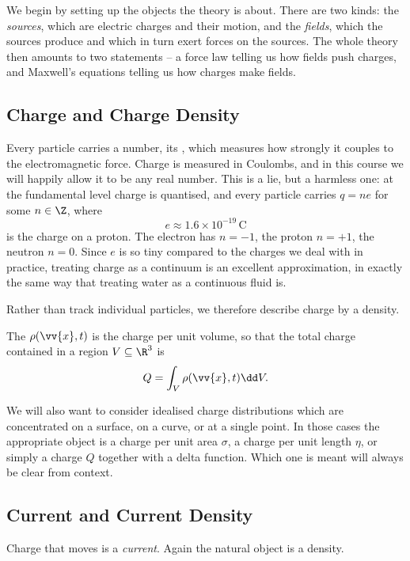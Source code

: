 We begin by setting up the objects the theory is about. There are two kinds: the \emph{sources}, which are electric charges and their motion, and the \emph{fields}, which the sources produce and which in turn exert forces on the sources. The whole theory then amounts to two statements -- a force law telling us how fields push charges, and Maxwell's equations telling us how charges make fields.

\subsection{Charge and Charge Density}

Every particle carries a number, its , which measures how strongly it couples to the electromagnetic force. Charge is measured in Coulombs, and in this course we will happily allow it to be any real number. This is a lie, but a harmless one: at the fundamental level charge is quantised, and every particle carries $q = ne$ for some $n \in \Z$, where
$$
e \approx 1.6 \times 10^{-19}\,\mathrm{C}
$$
is the charge on a proton. The electron has $n = -1$, the proton $n = +1$, the neutron $n = 0$. Since $e$ is so tiny compared to the charges we deal with in practice, treating charge as a continuum is an excellent approximation, in exactly the same way that treating water as a continuous fluid is.

Rather than track individual particles, we therefore describe charge by a density.

\begin{definition}
	The  $\rho(\vv{x}, t)$ is the charge per unit volume, so that the total charge contained in a region $V \subseteq \R^3$ is
	$$
	Q = \int_V \rho(\vv{x}, t) \dd V.
	$$
\end{definition}

We will also want to consider idealised charge distributions which are concentrated on a surface, on a curve, or at a single point. In those cases the appropriate object is a charge per unit area $\sigma$, a charge per unit length $\eta$, or simply a charge $Q$ together with a delta function. Which one is meant will always be clear from context.

\subsection{Current and Current Density}

Charge that moves is a \emph{current}. Again the natural object is a density.

